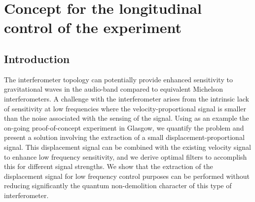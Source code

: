 \chapter{\label{c:speedmeter-control}Concept for the longitudinal control of the \SSM{} experiment}

\newcommand{\RT}{$\textrm{R}_{\textrm{T}}$}
\newcommand{\MINT}{$\textrm{M}_{\textrm{I}}$}


\section{Introduction}

The \SSM{} interferometer topology can potentially provide enhanced sensitivity to gravitational waves in the audio-band compared to equivalent Michelson interferometers. A challenge with the \SSM{} interferometer arises from the intrinsic lack of sensitivity at low frequencies where the velocity-proportional signal is smaller than the noise associated with the sensing of the signal. Using as an example the on-going proof-of-concept \SSM{} experiment in Glasgow, we quantify the problem and present a solution involving the extraction of a small displacement-proportional signal. This displacement signal can be combined with the existing velocity signal to enhance low frequency sensitivity, and we derive optimal filters to accomplish this for different signal strengths. We show that the extraction of the displacement signal for low frequency control purposes can be performed without reducing significantly the quantum non-demolition character of this type of interferometer.

